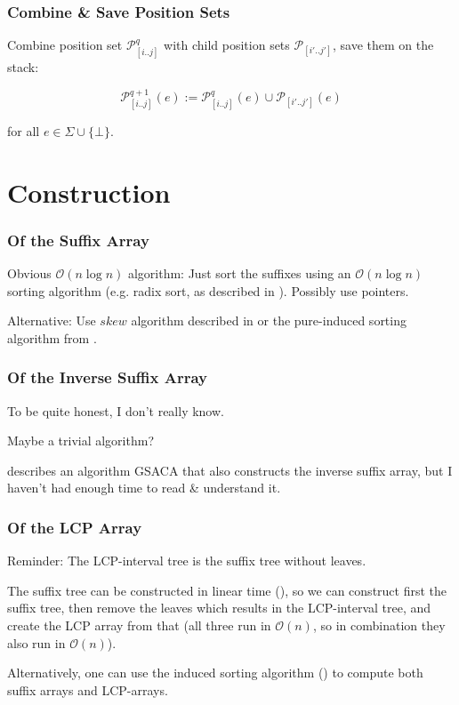\documentclass[compress,handout]{beamer} %
\renewcommand{\O}{\mathcal{O}}
\begin{document}
\begin{frame}
	\frametitle{Combine \& Save Position Sets}
	Combine position set $\mathcal{P}^{q}_{[i..j]}$ with child
	position sets $\mathcal{P}_{[i'..j']}$, save them on the stack:

	\begin{equation}
		\mathcal{P}^{q+1}_{[i..j]}(e):=\mathcal{P}^{q}_{[i..j]}(e) \cup \mathcal{P}_{[i'..j']}(e)
	\end{equation}

	for all $e \in \Sigma \cup \{\bot \}$.
\end{frame}

\section{Construction}

\begin{frame}
	\frametitle{Of the Suffix Array} Obvious $\O(n \log n)$
	algorithm: Just sort the suffixes using an $\O(n \log
	n)$ sorting algorithm (e.g. radix sort, as described in
	\cite{manber1994suffix}). Possibly use pointers.

	Alternative: Use $skew$ algorithm described in
	\cite{karkkainen2003simple} or the pure-induced sorting
	algorithm from \cite{nong2009linear}.
\end{frame}

\begin{frame}
	\frametitle{Of the Inverse Suffix Array}
	To be quite honest, I don't really know.

	Maybe a trivial algorithm?

	\cite{baier2015linear} describes an algorithm GSACA that also
	constructs the inverse suffix array, but I haven't had enough
	time to read \& understand it.
\end{frame}

\begin{frame}
	\frametitle{Of the LCP Array}
	Reminder: The LCP-interval tree is the suffix tree without leaves.

	The suffix tree can be constructed in linear time
	(\cite{giegerich1997ukkonen}), so we can construct first
	the suffix tree, then remove the leaves which results in the
	LCP-interval tree, and create the LCP array from that (all three
	run in $\O(n)$, so in combination they also run in $\O(n)$).

	Alternatively, one can use the induced sorting algorithm
	(\cite{fischer2011inducing}) to compute both suffix arrays
	and LCP-arrays.
\end{frame}
\end{document}
